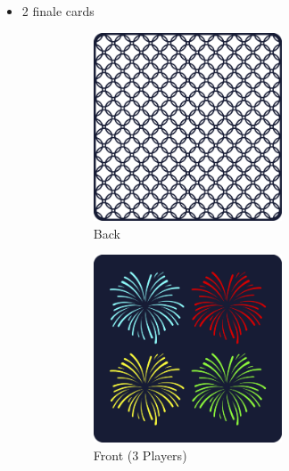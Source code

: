 \documentclass[a6paper, 12pt, parskip=half, DIV=14]{scrartcl}
\begin{document}
\begin{itemize}[nosep, leftmargin=*]
\begin{figure}[H]
			\end{figure}      
      \item 2 finale cards
      	\vspace{-1ex}      
			\begin{figure}[H]
			\centering
				\begin{subfigure}{0.3\textwidth}
				\centering
					\includegraphics[width=0.66\textwidth]{Images/target_card_back_display.png}
					\caption*{{\scriptsize Back}}
				\end{subfigure}
				\begin{subfigure}{0.3\textwidth}
				\centering
					\includegraphics[width=0.66\textwidth]{Images/finale_card_4_display.png}
					\caption*{{\scriptsize Front (3 Players)}}
				\end{subfigure}
				\begin{subfigure}{0.3\textwidth}

\end{subfigure}
\end{figure}
\end{itemize}
\end{document}
